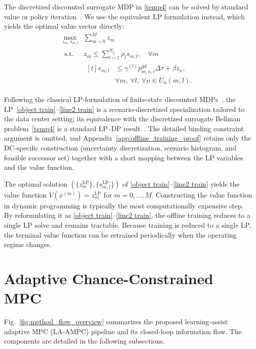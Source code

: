 \documentclass[a4paper,fleqn]{cas-dc}
\theoremstyle{plain}
\theoremstyle{remark}
\theoremstyle{plain}
\begin{document}
The discretized discounted surrogate MDP in \eqref{temp4} can be solved by standard value or policy iteration~\cite{puterman1994_mdp_book}. We use the equivalent LP formulation instead, which yields the optimal value vector directly:
\begin{align}
\max _{z_m, s_{m, l}} & \sum_{m=0}^M z_m \label{object train} \\ 
\text { s.t. } & z_m \leq \sum_{l=1}^{N_{\xi^{'}}} \rho_l s_{m, l}, \quad \forall m \label{line1 train}\\
& \begin{aligned}[t]s_{m,l} &\leq \gamma^{(l)}p_{m,n,l}^{gd}\Delta\tau+\beta z_n,\\ &\forall m,\ \forall l,\ \forall n\in U_n(m,l).\end{aligned}\label{line2 train}
\end{align}

Following the classical LP-formulation of finite-state discounted MDPs~\cite{puterman1994_mdp_book}, the LP~\eqref{object train}--\eqref{line2 train} is a scenario-discretized specialization tailored to the data center setting; its equivalence with the discretized surrogate Bellman problem~\eqref{temp4} is a standard LP--DP result~\cite{puterman1994_mdp_book}. The detailed binding constraint argument is omitted, and Appendix~\ref{app:offline_training_proof} retains only the DC-specific construction (uncertainty discretization, scenario histogram, and feasible successor set) together with a short mapping between the LP variables and the value function.

The optimal solution $(\{z_m^{\mathrm{LP}}\},\{s_{m,l}^{\mathrm{LP}}\})$ of \eqref{object train}--\eqref{line2 train} yields the value function $V(x^{(m)})=z_m^{\mathrm{LP}}$ for $m=0,\ldots,M$. Constructing the value function in dynamic programming is typically the most computationally expensive step. By reformulating it as \eqref{object train}--\eqref{line2 train}, the offline training reduces to a single LP solve and remains tractable. Because training is reduced to a single LP, the terminal value function can be retrained periodically when the operating regime changes.

\section{Adaptive Chance-Constrained MPC}\label{sec:adaptive_mpc}
Fig.~\ref{fig:method_flow_overview} summarizes the proposed learning-assist adaptive MPC (LA-AMPC) pipeline and its closed-loop information flow. The components are detailed in the following subsections.
\end{document}
